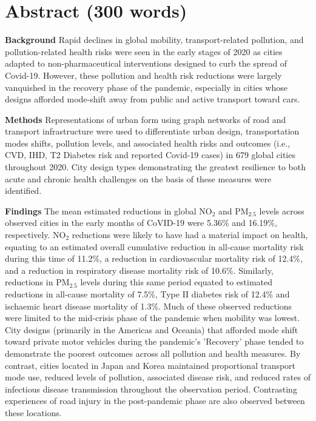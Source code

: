 \documentclass[preprint,10pt]{elsarticle} %
\newcommand{\absdiv}[1]{%
  \par\addvspace{.5\baselineskip}%
  \noindent\textbf{#1}\quad\ignorespaces}
\begin{document}
\section*{Abstract (300 words)}
 \absdiv{\textcolor{OliveGreen}{Background}}
Rapid declines in global mobility, transport-related pollution, and pollution-related health risks were seen in the early stages of 2020 as cities adapted to non-pharmaceutical interventions designed to curb the spread of Covid-19. However, these pollution and health risk reductions were largely vanquished in the recovery phase of the pandemic, especially in cities whose designs afforded mode-shift away from public and active transport toward cars. 
 \absdiv{\textcolor{OliveGreen}{Methods}}
Representations of urban form using graph networks of road and transport infrastructure were used to differentiate urban design, transportation modes shifts, pollution levels, and associated health risks and outcomes (i.e., CVD, IHD, T2 Diabetes risk and reported Covid-19 cases) in 679 global cities throughout 2020. City design types demonstrating the greatest resilience to both acute and chronic health challenges on the basis of these measures were identified.
 \absdiv{\textcolor{OliveGreen}{Findings}}
The mean estimated reductions in global NO$_{2}$ and PM$_{2.5}$ levels across observed cities in the early months of CoVID-19 were 5.36\% and 16.19\%, respectively. NO$_{2}$ reductions were likely to have had a material impact on health, equating to an estimated overall cumulative reduction in all-cause mortality risk during this time of 11.2\%, a reduction in cardiovascular mortality risk of 12.4\%, and a reduction in respiratory disease mortality risk of 10.6\%. Similarly, reductions in PM$_{2.5}$ levels during this same period equated to estimated reductions in all-cause mortality of 7.5\%, Type II diabetes risk of 12.4\% and ischaemic heart disease mortality of 1.3\%. Much of these observed reductions were limited to the mid-crisis phase of the pandemic when mobility was lowest. City designs  (primarily in the Americas and Oceania) that afforded mode shift toward private motor vehicles during the pandemic's 'Recovery' phase tended to demonstrate the poorest outcomes across all pollution and health measures. By contrast, cities located in Japan and Korea maintained proportional transport mode use, reduced levels of pollution, associated disease risk, and reduced rates of infectious disease transmission throughout the observation period. Contrasting experiences of road injury in the post-pandemic phase are also observed between these locations. 
\end{document}
